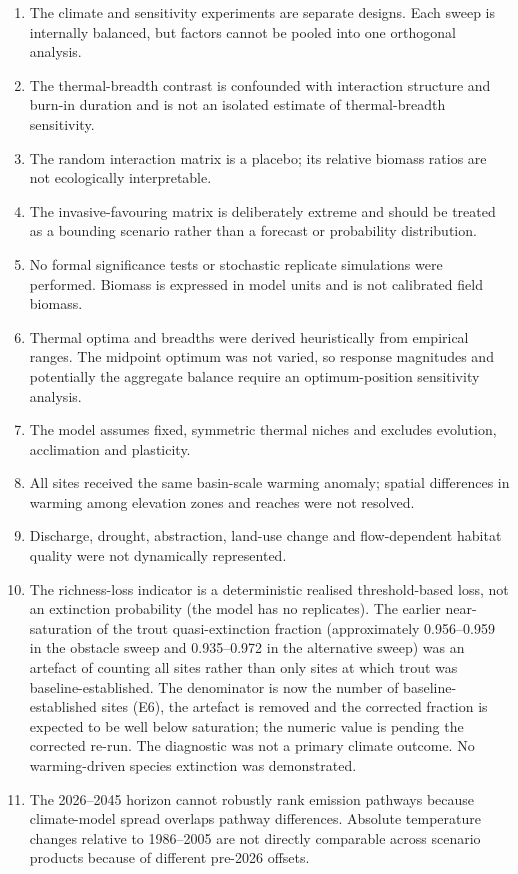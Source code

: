 \documentclass[11pt,a4paper]{article}
\begin{document}
\begin{enumerate}
    \item The climate and sensitivity experiments are separate designs. Each sweep is internally balanced, but factors cannot be pooled into one orthogonal analysis.
    \item The thermal-breadth contrast is confounded with interaction structure and burn-in duration and is not an isolated estimate of thermal-breadth sensitivity.
    \item The random interaction matrix is a placebo; its relative biomass ratios are not ecologically interpretable.
    \item The invasive-favouring matrix is deliberately extreme and should be treated as a bounding scenario rather than a forecast or probability distribution.
    \item No formal significance tests or stochastic replicate simulations were performed. Biomass is expressed in model units and is not calibrated field biomass.
    \item Thermal optima and breadths were derived heuristically from empirical ranges. The midpoint optimum was not varied, so response magnitudes and potentially the aggregate balance require an optimum-position sensitivity analysis.
    \item The model assumes fixed, symmetric thermal niches and excludes evolution, acclimation and plasticity.
    \item All sites received the same basin-scale warming anomaly; spatial differences in warming among elevation zones and reaches were not resolved.
    \item Discharge, drought, abstraction, land-use change and flow-dependent habitat quality were not dynamically represented.
    \item The richness-loss indicator is a deterministic realised threshold-based loss, not an extinction probability (the model has no replicates). The earlier near-saturation of the trout quasi-extinction fraction (approximately 0.956--0.959 in the obstacle sweep and 0.935--0.972 in the alternative sweep) was an artefact of counting all sites rather than only sites at which trout was baseline-established. The denominator is now the number of baseline-established sites (E6), the artefact is removed and the corrected fraction is expected to be well below saturation; the numeric value is pending the corrected re-run. The diagnostic was not a primary climate outcome. No warming-driven species extinction was demonstrated.
    \item The 2026--2045 horizon cannot robustly rank emission pathways because climate-model spread overlaps pathway differences. Absolute temperature changes relative to 1986--2005 are not directly comparable across scenario products because of different pre-2026 offsets.

\end{enumerate}
\end{document}
